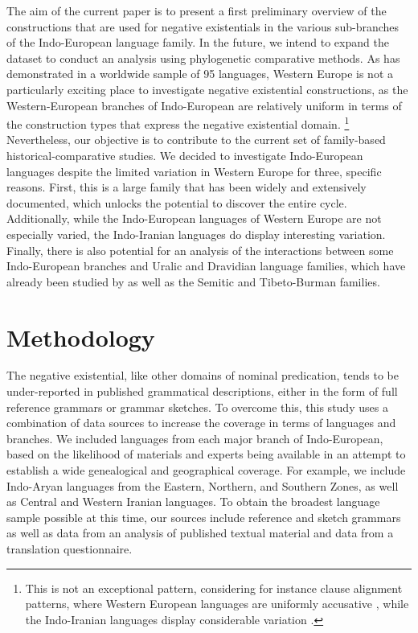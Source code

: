 \documentclass[output=paper,colorlinks,citecolor=brown]{langscibook}
\begin{document}
The aim of the current paper is to present a first preliminary overview of
the constructions that are used for negative existentials in the various
sub-branches of the Indo-European language family. In the future, we intend
to expand the dataset to conduct an analysis using phylogenetic comparative
methods. As \citet{Veselinova2013} has demonstrated in a worldwide sample
of 95 languages, Western Europe is not a particularly exciting place to
investigate negative existential constructions, as the Western-European
branches of Indo-European are relatively uniform in terms of the
construction types that express the negative existential
domain.%
%
\footnote{This is not an exceptional pattern, considering for instance
clause alignment patterns, where Western European languages are uniformly
accusative \citep{Siewierska2013}, while the Indo-Iranian languages display
considerable variation \parencites{Haig2008}{Verbeke2013}.} 
%
Nevertheless, our objective is to contribute to
the current set of family-based historical-comparative studies. We decided
to investigate Indo-European languages despite the limited variation in
Western Europe for three, specific reasons. First, this is a large family
that has been widely and extensively documented, which unlocks the
potential to discover the entire cycle. Additionally, while the
Indo-European languages of Western Europe are not especially varied, the
Indo-Iranian languages do display interesting variation. Finally, there is
also potential for an analysis of the interactions between some
Indo-European branches and Uralic and Dravidian language families, which
have already been studied by \citet{Veselinova2015,Veselinova2016} as well as the Semitic
and Tibeto-Burman families. 

\section{Methodology}\label{sec:ieur-3}

The negative existential, like other domains of nominal predication, tends
to be under-reported in published grammatical descriptions, either in the
form of full reference grammars or grammar sketches. To overcome this, this
study uses a combination of data sources to increase the coverage in terms
of languages and branches. We included languages from each major branch of
Indo-European, based on the likelihood of materials and experts being
available in an attempt to establish a wide genealogical and geographical
coverage. For example, we include Indo-Aryan languages from the Eastern,
Northern, and Southern Zones, as well as Central and Western Iranian
languages. To obtain the broadest language sample possible at this time,
our sources include reference and sketch grammars as well as data from an
analysis of published textual material and data from a translation
questionnaire.
\end{document}
